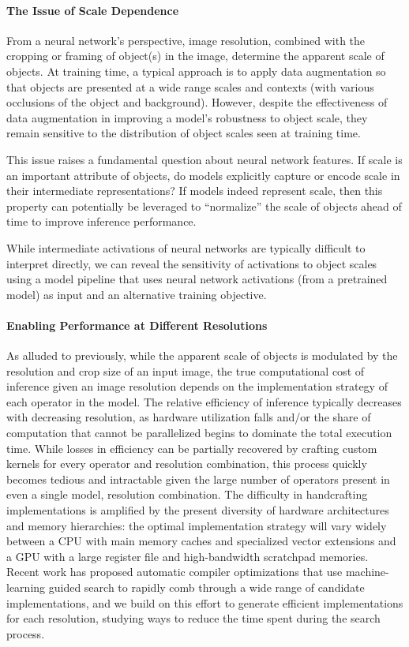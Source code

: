\paragraph{The Issue of Scale Dependence}
From a neural network's perspective, image resolution, combined with the cropping or framing of object(s) in the image, determine the apparent scale of objects.
At training time, a typical approach is to apply data augmentation so that objects are presented at a wide range scales and contexts (with various occlusions of the object and background).
However, despite the effectiveness of data augmentation in improving a model's robustness to object scale, they remain sensitive to the distribution of object scales seen at training time.

This issue raises a fundamental question about neural network features.
If scale is an important attribute of objects, do models explicitly capture or encode scale in their intermediate representations?
If models indeed represent scale, then this property can potentially be leveraged to ``normalize'' the scale of objects ahead of time to improve inference performance.

While intermediate activations of neural networks are typically difficult to interpret directly, we can reveal the sensitivity of activations to object scales using a model pipeline that uses neural network activations (from a pretrained model) as input and an alternative training objective.


\paragraph{Enabling Performance at Different Resolutions}
As alluded to previously, while the apparent scale of objects is modulated by the resolution and crop size of an input image, the true computational cost of inference given an image resolution depends on the implementation strategy of each operator in the model.
The relative efficiency of inference typically decreases with decreasing resolution, as hardware utilization falls and/or the share of computation that cannot be parallelized begins to dominate the total execution time.
While losses in efficiency can be partially recovered by crafting custom kernels for every operator and resolution combination, this process quickly becomes tedious and intractable given the large number of operators present in even a single model, resolution combination.
The difficulty in handcrafting implementations is amplified by the present diversity of hardware architectures and memory hierarchies: the optimal implementation strategy will vary widely between a CPU with main memory caches and specialized vector extensions and a GPU with a large register file and high-bandwidth scratchpad memories.
Recent work has proposed automatic compiler optimizations that use machine-learning guided search to rapidly comb through a wide range of candidate implementations, and we build on this effort to generate efficient implementations for each resolution, studying ways to reduce the time spent during the search process.



